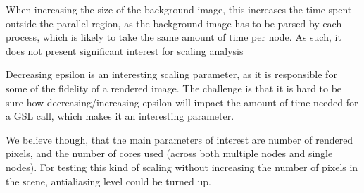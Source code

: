 When increasing the size of the background image, this increases the time spent outside the parallel region, as the background image has to be parsed by each process, which is likely to take the same amount of time per node. As such, it does not present significant interest for scaling analysis

Decreasing epsilon is an interesting scaling parameter, as it is responsible for some of the fidelity of a rendered image. The challenge is that it is hard to be sure how decreasing/increasing epsilon will impact the amount of time needed for a GSL call, which makes it an interesting parameter.

We believe though, that the main parameters of interest are number of rendered pixels, and the number of cores used (across both multiple nodes and single nodes). For testing this kind of scaling without increasing the number of pixels in the scene, antialiasing level could be turned up.


